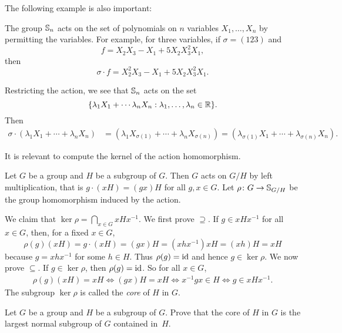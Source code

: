 The following example is also important: 

\begin{optional}
\begin{example}
    The group $\mathbb{S}_n$ acts on the set of polynomials on
    $n$ variables $X_1,\dots,X_n$
    by permitting the variables. For example, for three variables, if 
    $\sigma=(123)$ and 
    \[
    f=X_2X_3-X_1+5X_2X_3^2X_1,
    \]
    then 
    \[
    \sigma\cdot f=X_2^2X_3-X_1+5X_2X_3^2X_1.
    \]

    Restricting the action, we see that 
    $\mathbb{S}_n$ acts on the set 
    \[
    \{\lambda_1X_1+\cdots\lambda_nX_n:\lambda_1,\dots,\lambda_n\in\mathbb{R}\}.
    \]
    Then 
    \begin{align*}
    \sigma \cdot (\lambda_1X_1+\cdots+\lambda_nX_n) &= (\lambda_1X_{\sigma(1)}+\cdots+\lambda_nX_{\sigma(n)})
    =(\lambda_{\sigma(1)}X_1+\cdots+\lambda_{\sigma(n)}X_n).
    \end{align*}
\end{example}
\end{optional}


It is relevant to compute the kernel of the action homomorphism. 

\begin{example}
Let $G$ be a group and $H$ be a subgroup of $G$. Then $G$ 
acts on $G/H$ by left multiplication, that is 
$g\cdot (xH)=(gx)H$ for all $g,x\in G$. Let $\rho\colon G\to\mathbb{S}_{G/H}$ be the group homomorphism induced by the action. 

We claim that $\ker\rho=\bigcap_{x\in G}xHx^{-1}$. 
We first prove $\supseteq$. If $g\in xHx^{-1}$ for all 
$x\in G$, then, for a fixed $x\in G$,
 \[
 \rho(g)(xH)=g\cdot (xH)=(gx)H=(xhx^{-1})xH=(xh)H=xH
 \]
because $g=xhx^{-1}$ for some $h\in H$. Thus $\rho(g)=\operatorname{id}$ 
and hence $g\in\ker\rho$. We now prove 
$\subseteq$. If $g\in\ker\rho$, then
 $\rho(g)=\operatorname{id}$. So for all $x\in G$,
 \begin{align*}
\rho(g)(xH)=xH
\Longleftrightarrow (gx)H=xH
\Longleftrightarrow x^{-1}gx\in H
\Longleftrightarrow g\in xHx^{-1}.
 \end{align*}
The subgroup $\ker\rho$ is called the \emph{core} of $H$ in $G$. 
\end{example}

\begin{exercise}
    Let $G$ be a group and $H$ be a subgroup of $G$. Prove that
    the core 
    of $H$ in $G$ is the largest normal subgroup of $G$ 
    contained in~$H$.
\end{exercise}

